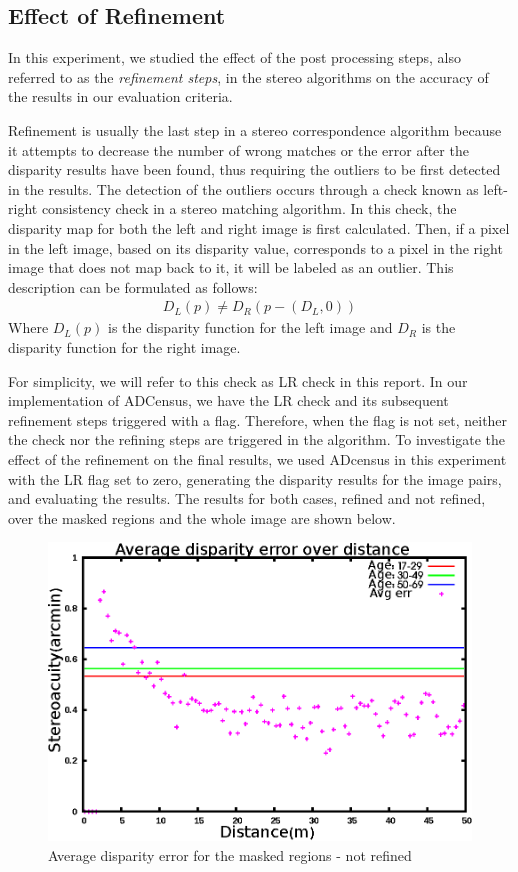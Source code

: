 \subsection{Effect of Refinement}
In this experiment, we studied the effect of the post processing steps, also referred to as the \textit{refinement steps}, 
in the stereo algorithms on the accuracy of the results in our evaluation criteria. 

Refinement is usually the last step in a stereo correspondence algorithm because it attempts to decrease the 
number of wrong matches or the error after the disparity results have been found, thus requiring the outliers to be first detected in the results. 
The detection of the outliers occurs through a check known as left-right consistency check in a stereo matching algorithm. In this check, the disparity map for both
the left and right image is first calculated. Then, if a pixel in the left image, based on its disparity value, corresponds to a pixel in the right image
that does not map back to it, it will be labeled as an outlier. This description can be formulated as follows:
\begin{align}
D_{L}(p) \neq D_{R}(p-(D_{L},0))
\end{align}
\noindent
Where $D_{L}(p)$ is the disparity function for the left image and $D_{R}$ is the disparity function for the right image.

For simplicity, we will refer
to this check as LR check in this report.
In our implementation of ADCensus, we have the LR check and its subsequent refinement steps triggered with a flag.
Therefore, when the flag is not set, neither the check nor the refining steps are triggered in the algorithm.
To investigate the effect of the refinement on the final results, we used 
ADcensus in this experiment with the LR flag set to zero, generating the disparity results for the image pairs, and evaluating the results.
The results for both cases, refined and not refined, over the masked regions and the whole image are shown below.

\begin{figure}[H]
\centering
\includegraphics[scale=0.8]{adcenmsk3NoLR}
\caption{Average disparity error for the masked regions - not refined}
\label{fig:adcmnoLR}
\end{figure} 

